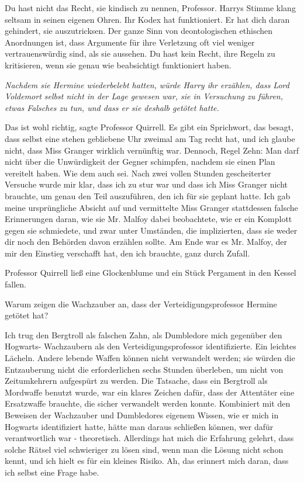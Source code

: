 \glqq{}Du hast nicht das Recht, sie kindisch zu nennen, Professor.\grqq{} Harrys Stimme
klang seltsam in seinen eigenen Ohren. \glqq{}Ihr Kodex hat funktioniert. Er hat
dich daran gehindert, sie auszutricksen. Der ganze Sinn von deontologischen
ethischen Anordnungen ist, dass Argumente für ihre Verletzung oft viel weniger
vertrauenswürdig sind, als sie aussehen. Du hast kein Recht, ihre Regeln zu
kritisieren, wenn sie genau wie beabsichtigt funktioniert haben.\grqq{}

\emph{Nachdem sie Hermine wiederbelebt hatten, würde Harry ihr erzählen, dass
Lord Voldemort selbst nicht in der Lage gewesen war, sie in Versuchung zu
führen, etwas Falsches zu tun, und dass er sie deshalb getötet hatte.}

\glqq{}Das ist wohl richtig\grqq{}, sagte Professor Quirrell. \glqq{}Es gibt ein
Sprichwort, das besagt, dass selbst eine stehen gebliebene Uhr zweimal am Tag
recht hat, und ich glaube nicht, dass Miss Granger wirklich vernünftig war.
Dennoch, Regel Zehn: Man darf nicht über die Unwürdigkeit der Gegner schimpfen,
nachdem sie einen Plan vereitelt haben. Wie dem auch sei. Nach zwei vollen
Stunden gescheiterter Versuche wurde mir klar, dass ich zu stur war und dass ich
Miss Granger nicht brauchte, um genau den Teil auszuführen, den ich für sie
geplant hatte. Ich gab meine ursprüngliche Absicht auf und vermittelte Miss
Granger stattdessen falsche Erinnerungen daran, wie sie Mr. Malfoy dabei
beobachtete, wie er ein Komplott gegen sie schmiedete, und zwar unter Umständen,
die implizierten, dass sie weder dir noch den Behörden davon erzählen sollte. Am
Ende war es Mr. Malfoy, der mir den Einstieg verschafft hat, den ich brauchte,
ganz durch Zufall.\grqq{}

Professor Quirrell ließ eine Glockenblume und ein Stück Pergament in den Kessel
fallen.

\glqq{}Warum zeigen die Wachzauber an, dass der Verteidigungsprofessor Hermine
getötet hat?\grqq{}

\glqq{}Ich trug den Bergtroll als falschen Zahn, als Dumbledore mich gegenüber
den Hogwarts- Wachzaubern als den Verteidigungsprofessor identifizierte.\grqq{} Ein
leichtes Lächeln. \glqq{}Andere lebende Waffen können nicht verwandelt werden;
sie würden die Entzauberung nicht die erforderlichen sechs Stunden überleben, um
nicht von Zeitumkehrern aufgespürt zu werden. Die Tatsache, dass ein Bergtroll
als Mordwaffe benutzt wurde, war ein klares Zeichen dafür, dass der Attentäter
eine Ersatzwaffe brauchte, die sicher verwandelt werden konnte. Kombiniert mit
den Beweisen der Wachzauber und Dumbledores eigenem Wissen, wie er mich in
Hogwarts identifiziert hatte, hätte man daraus schließen können, wer dafür
verantwortlich war - theoretisch. Allerdings hat mich die Erfahrung gelehrt,
dass solche Rätsel viel schwieriger zu lösen sind, wenn man die Lösung nicht
schon kennt, und ich hielt es für ein kleines Risiko. Ah, das erinnert mich
daran, dass ich selbst eine Frage habe.\grqq{}

